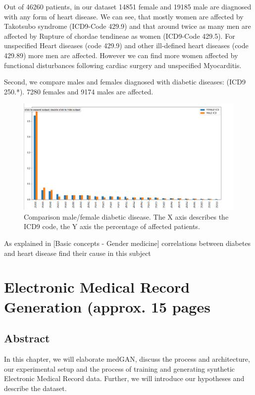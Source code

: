 \documentclass[11pt, a4paper]{book}
\begin{document}
Out of 46260 patients, in our dataset 14851 female and 19185 male are diagnosed with any form of heart disease. We can see, that mostly women are affected by Takotsubo syndrome (ICD9-Code 429.9) and that around twice as many men are affected by Rupture of chordae tendineae as women (ICD9-Code 429.5). For unspecified Heart diseases (code 429.9) and other ill-defined heart diseases (code 429.89) more men are affected.  However we can find more women affected by functional disturbances following cardiac surgery and unspecified Myocarditis. 

Second, we compare males and females diagnosed with diabetic diseases: (ICD9 250.*). 7280 females and 9174 males are affected.

\begin{figure}
  \begin{center}
  \includegraphics[width=1\textwidth]{img/comparison_diabetic.png}
  \caption{Comparison male/female diabetic disease. The X axis describes the ICD9 code, the Y axis the percentage of affected patients.}
  \label{fig:diabetic_comparison}
  \end{center}
\end{figure}

As explained in [Basic concepts - Gender medicine] correlations between diabetes and heart disease find their cause in this subject

\chapter{Electronic Medical Record Generation (approx. 15 pages}
\section{Abstract}
In this chapter, we will elaborate medGAN, discuss the process and architecture, our experimental setup and the process of training and generating synthetic Electronic Medical Record data. Further, we will introduce our hypotheses and describe the dataset.
\end{document}
